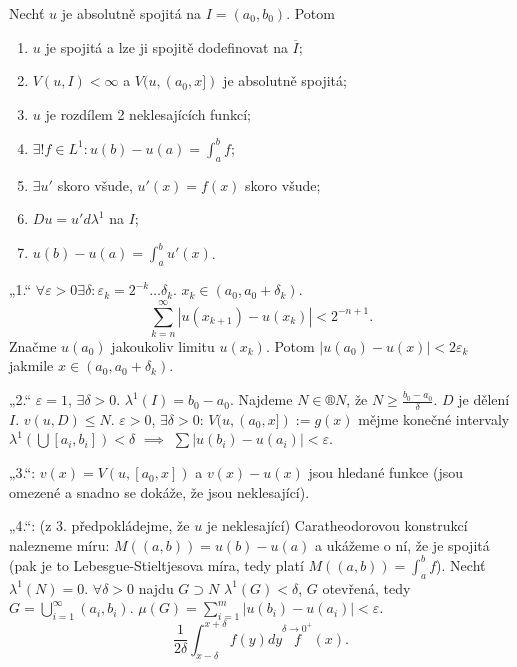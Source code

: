 \documentclass[12pt]{article}					%
\begin{document}
\begin{veta}
	Nechť $u$ je absolutně spojitá na $I = (a_0, b_0)$. Potom
	\begin{enumerate}
		\item $u$ je spojitá a lze ji spojitě dodefinovat na $\overline{I}$;
		\item $V(u, I) < ∞$ a $V(u, (a_0, x])$ je absolutně spojitá;
		\item $u$ je rozdílem 2 neklesajících funkcí;
		\item $\exists! f \in L^1: u(b) - u(a) = \int_a^b f$;
		\item $\exists u'$ skoro všude, $u'(x) = f(x)$ skoro všude;
		\item $Du = u' dλ^1$ na $I$;
		\item $u(b) - u(a) = \int_a^b u'(x)$.
	\end{enumerate}

	\begin{dukazin}
		„1.“ $\forall ε > 0 \exists δ: ε_k = 2^{-k} … δ_k$. $x_k \in (a_0, a_0 + δ_k)$.
		$$ \sum_{k=n}^∞ |u(x_{k + 1}) - u(x_k)| < 2^{-n + 1}. $$
		Značme $u(a_0)$ jakoukoliv limitu $u(x_k)$. Potom $|u(a_0) - u(x)| < 2ε_k$ jakmile $x \in (a_0, a_0 + δ_k)$.

		„2.“ $ε = 1$, $\exists δ > 0$. $λ^1(I) = b_0 - a_0$. Najdeme $N \in ®N$, že $N ≥ \frac{b_0 - a_0}{δ}$. $D$ je dělení $I$. $v(u, D) ≤ N$. $ε > 0$, $\exists δ > 0$: $V(u, (a_0, x]) := g(x)$ mějme konečné intervaly $λ^1(\bigcup [a_i, b_i]) < δ$ $\implies$ $\sum |u(b_i) - u(a_i)| < ε$.

		„3.“: $v(x) = V(u, [a_0, x])$ a $v(x) - u(x)$ jsou hledané funkce (jsou omezené a snadno se dokáže, že jsou neklesající).

		„4.“: (z 3. předpokládejme, že $u$ je neklesající) Caratheodorovou konstrukcí nalezneme míru: $M((a, b)) = u(b) - u(a)$ a ukážeme o ní, že je spojitá (pak je to Lebesgue-Stieltjesova míra, tedy platí $M((a, b)) = \int_a^b f$). Nechť $λ^1(N) = 0$. $\forall δ > 0$ najdu $G \supset N$ $λ^1(G) < δ$, $G$ otevřená, tedy $G = \bigcup_{i=1}^∞(a_i, b_i)$. $μ(G) = \sum_{i=1}^m |u(b_i) - u(a_i)| < ε$.
		$$ \frac{1}{2δ} \int_{x - δ}^{x + δ} f(y) dy \overset{δ \rightarrow 0^+} f(x). $$

	\end{dukazin}
\end{veta}

\break
\end{document}
